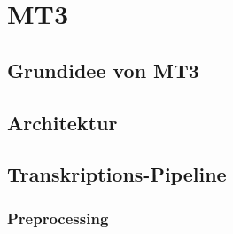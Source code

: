 \section{MT3}

\subsection{Grundidee von MT3}

\subsection{Architektur}

\subsection{Transkriptions-Pipeline}

\subsubsection*{Preprocessing}

